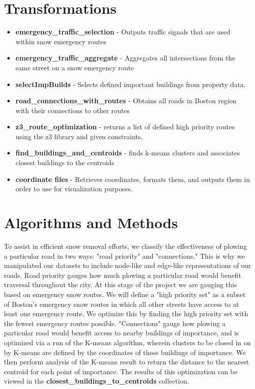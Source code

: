 \documentclass[15pt]{report}
\begin{document}
\section*{Transformations}
\begin{itemize}
	\item \textbf{emergency\_traffic\_selection} - Outputs traffic signals that are used within snow emergency routes
	\item \textbf{emergency\_traffic\_aggregate} - Aggregates all intersections from the same street on a snow emergency route
	\item \textbf{selectImpBuilds} - Selects defined important buildings from property data.
	\item \textbf{road\_connections\_with\_routes} - Obtains all roads in Boston region with their connections to other routes
	\item \textbf{z3\_route\_optimization} - returns a list of defined high priority routes using the z3 library and given constraints.
	\item \textbf{find\_buildings\_and\_centroids} - finds k-means clusters and associates closest buildings to the centroids
	\item \textbf{coordinate files} - Retrieves coordinates, formats them, and outputs them in order to use for visualization purposes.
\end{itemize}

\section*{Algorithms and Methods}
To assist in efficient snow removal efforts, we classify the effectiveness of plowing a particular road in two ways: "road priority" and "connections." This is why we manipulated our datasets to include node-like and edge-like representations of our roads. Road priority gauges how much plowing a particular road would benefit traversal throughout the city. At this stage of the project we are gauging this based on emergency snow routes. We will define a "high priority set" as a subset of Boston's emergency snow routes in which all other streets have access to at least one emergency route. We optimize this by finding the high priority set with the fewest emergency routes possible. "Connections" gauge how plowing a particular road would benefit access to nearby buildings of importance, and is optimized via a run of the K-means algorithm, wherein clusters to be closed in on by K-means are defined by the coordinates of these buildings of importance. We then perform analysis of the K-means result to return the distance to the nearest centroid for each point of importance. The results of this optimization can be viewed in the \textbf{closest\_buildings\_to\_centroids} collection.
\end{document}
